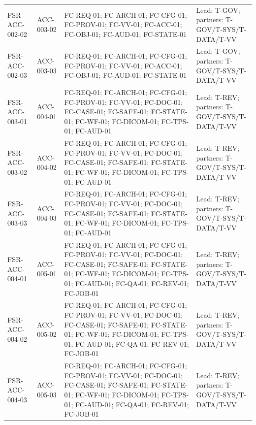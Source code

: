 \documentclass[11pt,letterpaper]{article}
\begin{document}
\begin{scriptsize}
\begin{longtable}{@{}L{0.16\textwidth}L{0.12\textwidth}L{0.49\textwidth}L{0.17\textwidth}@{}}
\addlinespace[2pt]
\mbox{FSR-ACC-002-02} & \mbox{ACC-003-02} & FC-REQ-01; FC-ARCH-01; FC-CFG-01; FC-PROV-01; FC-VV-01; FC-ACC-01; FC-OBJ-01; FC-AUD-01; FC-STATE-01 & Lead: T-GOV; partners: T-GOV\slash\allowbreak{}T-SYS\slash\allowbreak{}T-DATA\slash\allowbreak{}T-VV \\
\addlinespace[2pt]
\mbox{FSR-ACC-002-03} & \mbox{ACC-003-03} & FC-REQ-01; FC-ARCH-01; FC-CFG-01; FC-PROV-01; FC-VV-01; FC-ACC-01; FC-OBJ-01; FC-AUD-01; FC-STATE-01 & Lead: T-GOV; partners: T-GOV\slash\allowbreak{}T-SYS\slash\allowbreak{}T-DATA\slash\allowbreak{}T-VV \\
\addlinespace[2pt]
\mbox{FSR-ACC-003-01} & \mbox{ACC-004-01} & FC-REQ-01; FC-ARCH-01; FC-CFG-01; FC-PROV-01; FC-VV-01; FC-DOC-01; FC-CASE-01; FC-SAFE-01; FC-STATE-01; FC-WF-01; FC-DICOM-01; FC-TPS-01; FC-AUD-01 & Lead: T-REV; partners: T-GOV\slash\allowbreak{}T-SYS\slash\allowbreak{}T-DATA\slash\allowbreak{}T-VV \\
\addlinespace[2pt]
\mbox{FSR-ACC-003-02} & \mbox{ACC-004-02} & FC-REQ-01; FC-ARCH-01; FC-CFG-01; FC-PROV-01; FC-VV-01; FC-DOC-01; FC-CASE-01; FC-SAFE-01; FC-STATE-01; FC-WF-01; FC-DICOM-01; FC-TPS-01; FC-AUD-01 & Lead: T-REV; partners: T-GOV\slash\allowbreak{}T-SYS\slash\allowbreak{}T-DATA\slash\allowbreak{}T-VV \\
\addlinespace[2pt]
\mbox{FSR-ACC-003-03} & \mbox{ACC-004-03} & FC-REQ-01; FC-ARCH-01; FC-CFG-01; FC-PROV-01; FC-VV-01; FC-DOC-01; FC-CASE-01; FC-SAFE-01; FC-STATE-01; FC-WF-01; FC-DICOM-01; FC-TPS-01; FC-AUD-01 & Lead: T-REV; partners: T-GOV\slash\allowbreak{}T-SYS\slash\allowbreak{}T-DATA\slash\allowbreak{}T-VV \\
\addlinespace[2pt]
\mbox{FSR-ACC-004-01} & \mbox{ACC-005-01} & FC-REQ-01; FC-ARCH-01; FC-CFG-01; FC-PROV-01; FC-VV-01; FC-DOC-01; FC-CASE-01; FC-SAFE-01; FC-STATE-01; FC-WF-01; FC-DICOM-01; FC-TPS-01; FC-AUD-01; FC-QA-01; FC-REV-01; FC-JOB-01 & Lead: T-REV; partners: T-GOV\slash\allowbreak{}T-SYS\slash\allowbreak{}T-DATA\slash\allowbreak{}T-VV \\
\addlinespace[2pt]
\mbox{FSR-ACC-004-02} & \mbox{ACC-005-02} & FC-REQ-01; FC-ARCH-01; FC-CFG-01; FC-PROV-01; FC-VV-01; FC-DOC-01; FC-CASE-01; FC-SAFE-01; FC-STATE-01; FC-WF-01; FC-DICOM-01; FC-TPS-01; FC-AUD-01; FC-QA-01; FC-REV-01; FC-JOB-01 & Lead: T-REV; partners: T-GOV\slash\allowbreak{}T-SYS\slash\allowbreak{}T-DATA\slash\allowbreak{}T-VV \\
\addlinespace[2pt]
\mbox{FSR-ACC-004-03} & \mbox{ACC-005-03} & FC-REQ-01; FC-ARCH-01; FC-CFG-01; FC-PROV-01; FC-VV-01; FC-DOC-01; FC-CASE-01; FC-SAFE-01; FC-STATE-01; FC-WF-01; FC-DICOM-01; FC-TPS-01; FC-AUD-01; FC-QA-01; FC-REV-01; FC-JOB-01 & Lead: T-REV; partners: T-GOV\slash\allowbreak{}T-SYS\slash\allowbreak{}T-DATA\slash\allowbreak{}T-VV \\

\end{longtable}
\end{scriptsize}
\end{document}
